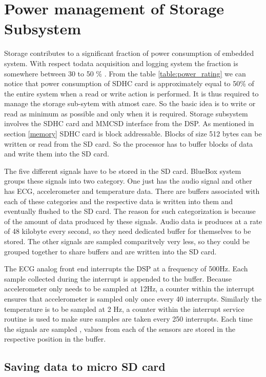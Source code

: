 \section{Power management of Storage Subsystem}
Storage contributes to a significant fraction of power consumption of embedded system. With respect todata acquisition and logging system the fraction is somewhere between 30 to 50 \% . From the table \ref{table:power_rating} we can notice that power consumption of SDHC card is approximately equal to 50\% of the entire system when a read or write action is performed. It is thus required to manage the storage sub-sytem with atmost care. So the basic idea is to write or read as minimum as possible and only when it is required.
Storage subsystem involves the SDHC card and MMCSD interface from the DSP. As mentioned in section \ref{memory} SDHC card is block addressable. Blocks of size 512 bytes can be written or read from the SD card. So the processor has to buffer blocks of data and write them into the SD card.  

The five different signals have to be stored in the SD card. BlueBox system groups these signals into two category. One just has the audio signal and other has ECG, accelerometer and temperature data. There are buffers associated with each of these categories and the respective data is written into them and eventually flushed to the SD card. The reason for such categorization is because of the amount of data produced by these signals. Audio data is produces at a rate of 48 kilobyte every second, so they need dedicated buffer for themselves to be stored. The other signals are sampled comparitvely very less, so they could be grouped together to share buffers and are written into the SD card. 

The ECG analog front end interrupts the DSP at a frequency of 500Hz. Each sample collected during the interrupt is appended to the buffer. Because accelerometer only needs to be sampled at 12Hz, a counter within the interrupt ensures that accelerometer is sampled only once every 40 interrupts. Similarly the temperature is to be sampled at 2 Hz, a counter within the interrupt service routine is used to make sure samples are taken every 250 interrupts. Each time the signals are sampled , values from each of the sensors are stored in the respective position in the buffer. 
\subsection{Saving data to micro SD card}

